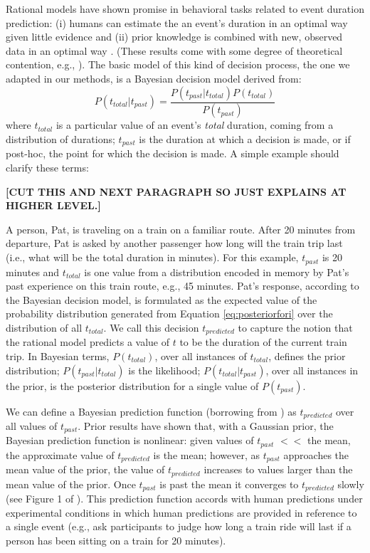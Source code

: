 \documentclass[a4paper,man,natbib]{apa6}
\begin{document}
Rational models have shown promise in behavioral tasks related to event duration prediction:  (i) humans can estimate the an event's duration in an optimal way given little evidence and (ii) prior knowledge is combined with new, observed data in an optimal way \citep{GriffithsTenenbaum2006,GriffithsTenenbaum2011,Tauber2017}.  (These results come with some degree of theoretical contention, e.g., \cite{MozerPashlerHomaei2008}).  The basic model of this kind of decision process, the one we adapted in our methods, is a Bayesian decision model derived from: 
\begin{equation}\label{eq:posteriorfori}
    P(t_{total} \vert t_{past}) = \frac{P(t_{past} \vert t_{total}) P(t_{total})} {P(t_{past})}
\end{equation}
where $t_{total}$ is a particular value of an event's \textit{total} duration, coming from a distribution of durations; $t_{past}$ is the duration at which a decision is made, or if post-hoc, the point for which the decision is made.  A simple example should clarify these terms:  

\textbf{[CUT THIS AND NEXT PARAGRAPH SO JUST EXPLAINS AT HIGHER LEVEL.]}

A person, Pat, is traveling on a train on a familiar route. After 20 minutes from departure, Pat is asked by another passenger how long will the train trip last (i.e., what will be the total duration in minutes).  For this example, $t_{past}$ is 20 minutes and $t_{total}$ is one value from a distribution encoded in memory by Pat's past experience on this train route, e.g., 45 minutes. Pat's response, according to the Bayesian decision model, is formulated as the expected value of the probability distribution generated from Equation \ref{eq:posteriorfori} over the distribution of all $t_{total}$. We call this decision $t_{predicted}$ to capture the notion that the rational model predicts a value of $t$ to be the duration of the current train trip.  In Bayesian terms, $P(t_{total})$, over all instances of $t_{total}$, defines the prior distribution; $P(t_{past} \vert t_{total})$ is the likelihood; $P(t_{total} \vert t_{past})$, over all instances in the prior, is the posterior distribution for a single value of $P(t_{past})$.

We can define a Bayesian prediction function (borrowing from \cite{GriffithsTenenbaum2006}) as $t_{predicted}$ over all values of $t_{past}$.  Prior results have shown that, with a Gaussian prior, the Bayesian prediction function is nonlinear: given values of $t_{past}$  $<<$ the mean, the approximate value of $t_{predicted}$ is the mean; however, as $t_{past}$ approaches the mean value of the prior, the value of $t_{predicted}$ increases to values larger than the mean value of the prior.  Once $t_{past}$ is past the mean it converges to $t_{predicted}$ slowly (see Figure 1 of \cite{GriffithsTenenbaum2006}).  This prediction function accords with human predictions under experimental conditions \citep{GriffithsTenenbaum2006} in which human predictions are provided in reference to a single event (e.g., ask participants to judge how long a train ride will last if a person has been sitting on a train for 20 minutes).
\end{document}
